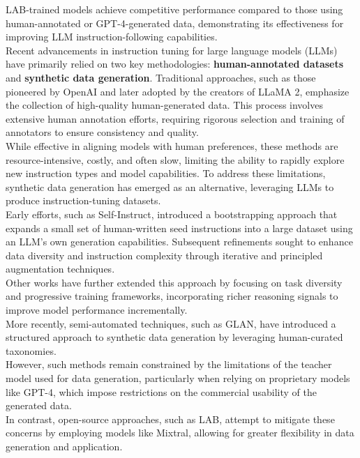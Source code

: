 \documentclass[12pt]{article}
\begin{document}
LAB-trained models achieve competitive performance compared to those using human-annotated or GPT-4-generated data, demonstrating its effectiveness for improving LLM instruction-following capabilities.\vspace{14pt}\\
Recent advancements in instruction tuning for large language models (LLMs) have primarily relied on two key methodologies: \textbf{human-annotated datasets} and \textbf{synthetic data generation}. Traditional approaches, such as those pioneered by OpenAI and later adopted by the creators of LLaMA 2, emphasize the collection of high-quality human-generated data. This process involves extensive human annotation efforts, requiring rigorous selection and training of annotators to ensure consistency and quality.\vspace{14pt}\\
While effective in aligning models with human preferences, these methods are resource-intensive, costly, and often slow, limiting the ability to rapidly explore new instruction types and model capabilities.
To address these limitations, synthetic data generation has emerged as an alternative, leveraging LLMs to produce instruction-tuning datasets.\vspace{14pt}\\
Early efforts, such as Self-Instruct, introduced a bootstrapping approach that expands a small set of human-written seed instructions into a large dataset using an LLM’s own generation capabilities. Subsequent refinements sought to enhance data diversity and instruction complexity through iterative and principled augmentation techniques.\\
Other works have further extended this approach by focusing on task diversity and progressive training frameworks, incorporating richer reasoning signals to improve model performance incrementally.\vspace{14pt}\\
More recently, semi-automated techniques, such as GLAN, have introduced a structured approach to synthetic data generation by leveraging human-curated taxonomies.\\
However, such methods remain constrained by the limitations of the teacher model used for data generation, particularly when relying on proprietary models like GPT-4, which impose restrictions on the commercial usability of the generated data.\vspace{14pt}\\
In contrast, open-source approaches, such as LAB, attempt to mitigate these concerns by employing models like Mixtral, allowing for greater flexibility in data generation and application.\vspace{14pt}\\
\end{document}
